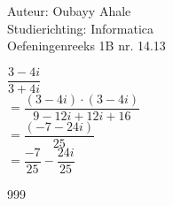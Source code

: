 \documentclass[a4paper]{article}
\begin{document}
  
\noindent \large Auteur: Oubayy Ahale          \\
\noindent \large Studierichting: Informatica   \\
\noindent \large Oefeningenreeks 1B nr. 14.13   \\

\medskip

\normalsize

$ \dfrac{3 - 4i}{3 + 4i} $\\


$ = \dfrac{(3 - 4i) \cdot (3 - 4i)}{9 - 12i + 12i +16} $\\

$ = \dfrac{(-7 - 24i)}{25}                             $\\

$ = \dfrac{-7}{25} - \dfrac{24i}{25}    $\\

\begin{thebibliography}{999}
\end{thebibliography}
\end{document}
